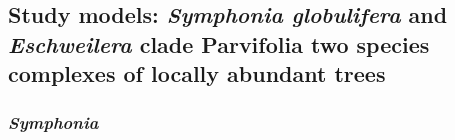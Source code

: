 \documentclass[12pt,twoside,a4paper, a]{article}
\begin{document}
\hypertarget{study-models-symphonia-globulifera-and-eschweilera-clade-parvifolia-two-species-complexes-of-locally-abundant-trees}{%
\subsection{\texorpdfstring{Study models: \emph{Symphonia globulifera} and \emph{Eschweilera} clade Parvifolia two species complexes of locally abundant trees}{Study models: Symphonia globulifera and Eschweilera clade Parvifolia two species complexes of locally abundant trees}}\label{study-models-symphonia-globulifera-and-eschweilera-clade-parvifolia-two-species-complexes-of-locally-abundant-trees}}

\hypertarget{symphonia}{%
\subsubsection{\texorpdfstring{\emph{Symphonia}}{Symphonia}}\label{symphonia}}
\end{document}
